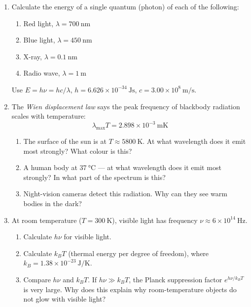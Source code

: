 \documentclass[12pt, a4paper]{book}
\newcommand{\newterm}[1]{\textit{\textcolor{DiscoveryColor}{#1}}}
\begin{document}
\begin{problembox}
\begin{enumerate}[label=\textbf{\arabic*.}]
  \item Calculate the energy of a single quantum (photon)
        of each of the following:
        \begin{enumerate}[label=(\alph*)]
          \item Red light, $\lambda = 700\ \si{\nano\metre}$
          \item Blue light, $\lambda = 450\ \si{\nano\metre}$
          \item X-ray, $\lambda = 0.1\ \si{\nano\metre}$
          \item Radio wave, $\lambda = 1\ \si{\metre}$
        \end{enumerate}
        Use $E = h\nu = hc/\lambda$,
        $h = 6.626\times10^{-34}\ \si{\joule\second}$,
        $c = 3.00\times10^8\ \si{\metre\per\second}$.

  \item The \newterm{Wien displacement law} says the peak
        frequency of blackbody radiation scales with temperature:
        \[
          \lambda_\text{max} T = 2.898\times10^{-3}\ \si{\metre\kelvin}
        \]
        \begin{enumerate}[label=(\alph*)]
          \item The surface of the sun is at $T \approx 5800\ \si{\kelvin}$.
                At what wavelength does it emit most strongly?
                What colour is this?
          \item A human body at $37\ \si{\celsius}$ --- at what
                wavelength does it emit most strongly?
                In what part of the spectrum is this?
          \item Night-vision cameras detect this radiation.
                Why can they see warm bodies in the dark?
        \end{enumerate}

  \item At room temperature ($T = 300\ \si{\kelvin}$),
        visible light has frequency
        $\nu \approx 6\times10^{14}\ \si{\hertz}$.
        \begin{enumerate}[label=(\alph*)]
          \item Calculate $h\nu$ for visible light.
          \item Calculate $k_B T$ (thermal energy per degree
                of freedom), where
                $k_B = 1.38\times10^{-23}\ \si{\joule\per\kelvin}$.
          \item Compare $h\nu$ and $k_BT$.
                If $h\nu \gg k_BT$, the Planck suppression
                factor $e^{h\nu/k_BT}$ is very large.
                Why does this explain why room-temperature
                objects do not glow with visible light?
        \end{enumerate}
\end{enumerate}
\end{problembox}
\end{document}
